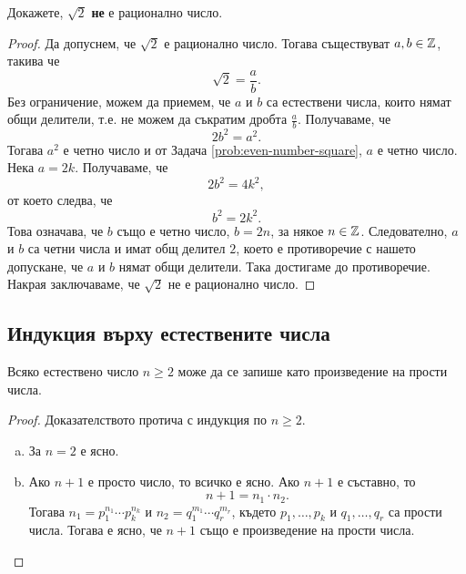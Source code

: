 \begin{problem}
  Докажете, $\sqrt{2}$ {\bf не} е рационално число.
\end{problem}
\begin{proof}
  Да допуснем, че $\sqrt{2}$ е рационално число. Тогава  съществуват $a,b \in \mathbb{Z}$, такива че
  \[\sqrt{2} = \frac{a}{b}.\]
  Без ограничение, можем да приемем, че $a$ и $b$ са естествени числа,
  които нямат общи делители, т.е. не можем да съкратим дробта $\frac{a}{b}$.
  Получаваме, че \[2b^2 = a^2.\]
  Тогава $a^2$ е четно число и от Задача \ref{prob:even-number-square}, $a$ е четно число.
  Нека $a = 2k$. Получаваме, че
  \[2b^2 = 4k^2,\]
  от което следва, че
  \[b^2 = 2k^2.\]
  Това означава, че $b$ също е четно число, $b = 2n$, за някое $n \in \mathbb{Z}$.
  Следователно, $a$ и $b$ са четни числа и имат общ делител $2$,
  което е противоречие с нашето допускане, че $a$ и $b$ нямат общи делители.
  Така достигаме до противоречие.
  Накрая заключаваме, че $\sqrt{2}$ не е рационално число.
\end{proof}


\subsection*{Индукция върху естествените числа}

\begin{problem}
  \label{prob:number-prod-prime}  
  Всяко естествено число $n \geq 2$ може да се запише като произведение на прости числа.
\end{problem}
\begin{proof}
  Доказателството протича с индукция по $n \geq 2$.
  \begin{enumerate}[a)]
  \item 
    За $n = 2$  е ясно.
  \item
    Ако $n+1$ е просто число, то всичко е ясно.
    Ако $n+1$ е съставно, то \[n + 1 = n_1\cdot n_2.\]
    Тогава $n_1 = p^{n_1}_1\cdots p^{n_k}_k$ и $n_2 = q^{m_1}_1\cdots q^{m_r}_r$,
    където $p_1,\dots,p_k$ и $q_1,\dots,q_r$ са прости числа.
    Тогава е ясно, че $n+1$ също е произведение на прости числа.
  \end{enumerate}
\end{proof}

